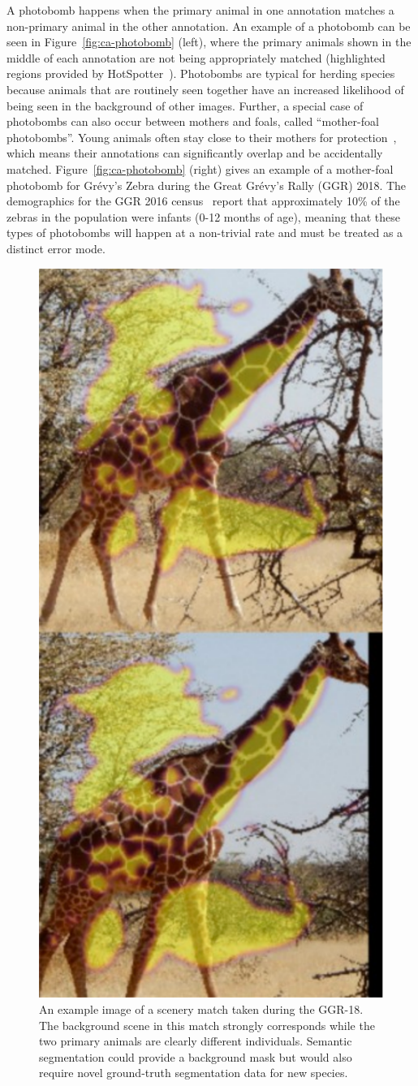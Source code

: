 A photobomb happens when the primary animal in one annotation matches a non-primary animal in the other annotation.  An example of a photobomb can be seen in Figure~\ref{fig:ca-photobomb} (left), where the primary animals shown in the middle of each annotation are not being appropriately matched (highlighted regions provided by HotSpotter~\cite{crall_hotspotter_2013}).  Photobombs are typical for herding species because animals that are routinely seen together have an increased likelihood of being seen in the background of other images.  Further, a special case of photobombs can also occur between mothers and foals, called ``mother-foal photobombs''.  Young animals often stay close to their mothers for protection~\cite{becker_mother-infant_1990}, which means their annotations can significantly overlap and be accidentally matched.  Figure~\ref{fig:ca-photobomb} (right) gives an example of a mother-foal photobomb for Gr\'evy's Zebra during the Great Gr\'evy's Rally (GGR) 2018.  The demographics for the GGR 2016 census~\cite{berger-wolf_great_2016} report that approximately 10\% of the zebras in the population were infants (0-12 months of age), meaning that these types of photobombs will happen at a non-trivial rate and must be treated as a distinct error mode.

\begin{figure}[!t]
    \begin{center}
        \includegraphics[width=0.53\linewidth]{resources/scenerymatch.pdf}
    \end{center}
    \caption{An example image of a scenery match taken during the GGR-18.  The background scene in this match strongly corresponds while the two primary animals are clearly different individuals.  Semantic segmentation could provide a background mask but would also require novel ground-truth segmentation data for new species.}
    \label{fig:ca-scenery-match}
\end{figure}


